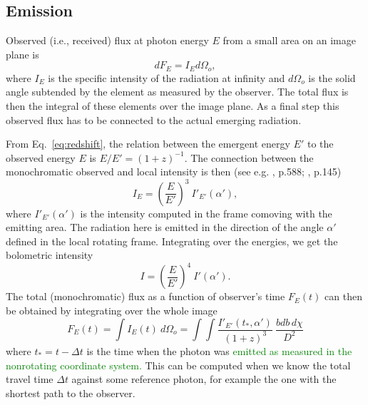 \documentclass{aa}
\newcommand{\be}{\begin{equation}}
\newcommand{\ee}{\end{equation}}
\newcommand{\red}[1]{\textcolor{red}{#1}}
\newcommand{\refe}[1]{\textcolor{green}{{#1}}}
\newcommand{\refedel}[1]{}
\begin{document}


\subsection{Emission}\label{sect:emission}
Observed (i.e., received) flux at photon energy $E$ from a small area on an image plane is
\be
dF_E = I_E d\Omega_o,
\ee
where $I_E$ is the specific intensity of the radiation at infinity and $d\Omega_o$ is the solid angle subtended by the element as measured by the observer. 
The total flux is then the integral of these elements over the image plane.
As a final step this observed flux has to be connected to the actual emerging radiation.

From Eq.~\eqref{eq:redshift}, the relation between the emergent energy $E'$ to the observed energy $E$ is $E/E' = (1 + z)^{-1}$.
The connection between the monochromatic observed and local intensity is then (see e.g. \citealt{MTW73}, p.588; \citealt{RL79}, p.145)
\be
I_E = \left( \frac{E}{E'} \right)^3 ~I'_{E'}(\alpha'),
\ee
where $I'_{E'}(\alpha')$ is the intensity computed in the frame comoving with the emitting area.
The radiation here is emitted in the direction of the angle $\alpha'$ defined in the local rotating frame.
Integrating over the energies, we get the bolometric intensity
\be
I = \left(\frac{E}{E'} \right)^4 ~I'(\alpha').
\ee
The total (monochromatic) flux as a function of observer's time $F_E(t)$ can then be obtained by integrating over the whole image
\be\label{eq:fluxint}
F_E(t) = \int I_{E}(t) ~d\Omega_o = \int\int \frac{I'_{E'}(t_*, \alpha')}{(1+z)^3}  ~\frac{bdb \, d\chi}{D^2}
\ee
where $t_* = t - \Delta t$ is the time when the photon was \refe{emitted as measured in the nonrotating coordinate system.}
This can be computed when we know the total travel time $\Delta t$ against some reference photon, for example the one with the shortest path to the observer.
\end{document}
